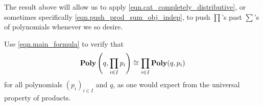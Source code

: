 \documentclass[Book-Poly]{subfiles}
\begin{document}
The result above will allow us to apply \eqref{eqn.cat_completely_distributive}, or sometimes specifically \eqref{eqn.push_prod_sum_obj_indep}, to push $\prod$'s past $\sum$'s of polynomials whenever we so desire.

\begin{exercise}%


	Use \eqref{eqn.main_formula}
	to verify that
	\[
	    \mathbf{Poly}\left(q, \prod_{i \in I} p_i\right) \cong \prod_{i \in I} \mathbf{Poly}(q, p_i)
	\]
	for all polynomials $(p_i)_{i \in I}$ and $q$, as one would expect from the universal property of products.
\qedhere
\begin{solution}



\end{solution}
\end{exercise}
\end{document}
